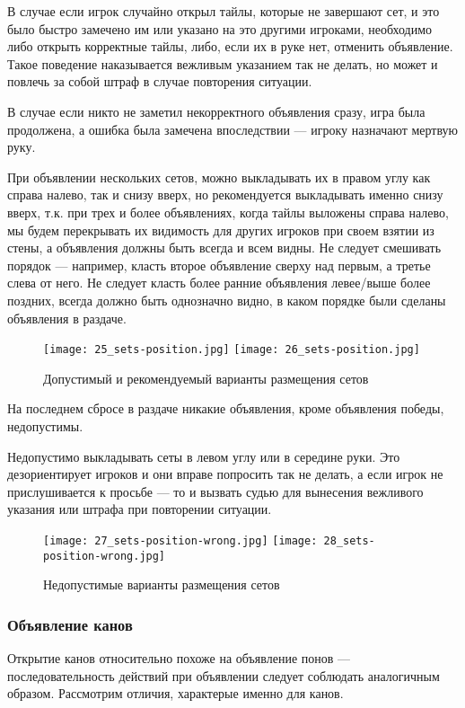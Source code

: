 В случае если игрок случайно открыл тайлы, которые не завершают сет, и это было быстро замечено им или указано на это другими игроками, необходимо либо открыть корректные тайлы, либо, если их в руке нет, отменить объявление. Такое поведение наказывается вежливым указанием так не делать, но может и повлечь за собой штраф в случае повторения ситуации.

В случае если никто не заметил некорректного объявления сразу, игра была продолжена, а ошибка была замечена впоследствии --- игроку назначают мертвую руку.

При объявлении нескольких сетов, можно выкладывать их в правом углу как справа налево, так и снизу вверх, но рекомендуется выкладывать именно снизу вверх, т.к. при трех и более объявлениях, когда тайлы выложены справа налево, мы будем перекрывать их видимость для других игроков при своем взятии из стены, а объявления должны быть всегда и всем видны. Не следует смешивать порядок --- например, класть второе объявление сверху над первым, а третье слева от него. Не следует класть более ранние объявления левее/выше более поздних, всегда должно быть однозначно видно, в каком порядке были сделаны объявления в раздаче.

\begin{figure}[H]
	\centering
	\texttt{[image: 25\_sets-position.jpg]}
	\texttt{[image: 26\_sets-position.jpg]}
	\caption{Допустимый и рекомендуемый варианты размещения сетов}
\end{figure}

На последнем сбросе в раздаче никакие объявления, кроме объявления победы, недопустимы.

Недопустимо выкладывать сеты в левом углу или в середине руки. Это дезориентирует игроков и они вправе попросить так не делать, а если игрок не прислушивается к просьбе --- то и вызвать судью для вынесения вежливого указания или штрафа при повторении ситуации.

\begin{figure}[H]
	\centering
	\texttt{[image: 27\_sets-position-wrong.jpg]}
	\texttt{[image: 28\_sets-position-wrong.jpg]}
	\caption{Недопустимые варианты размещения сетов}
\end{figure}

\subsubsection{Объявление канов}

Открытие канов относительно похоже на объявление понов --- последовательность действий при объявлении следует соблюдать аналогичным образом. Рассмотрим отличия, характерые именно для канов.

